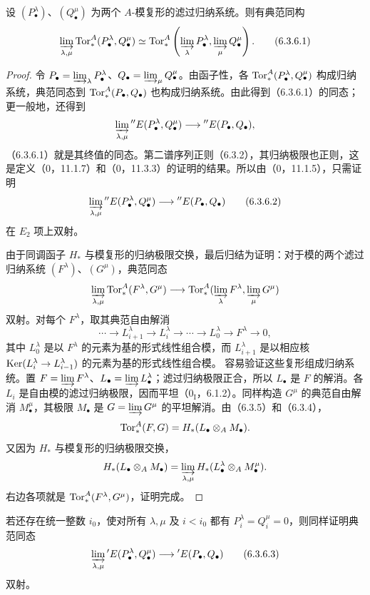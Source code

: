 设 $(P_\bullet^\lambda)$、$(Q_\bullet^\mu)$ 为两个 $A$-模复形的滤过归纳系统。则有典范同构
\begin{equation}
 \varinjlim_{\lambda,\mu}\operatorname{Tor}_*^A(P_\bullet^\lambda,Q_\bullet^\mu)
 \simeq\operatorname{Tor}_*^A\left(\varinjlim_\lambda P_\bullet^\lambda,
                         \varinjlim_\mu Q_\bullet^\mu\right).\tag{6.3.6.1}
\end{equation}
\begin{proof}
令 $P_\bullet=\varinjlim_\lambda P_\bullet^\lambda$、$Q_\bullet=\varinjlim_\mu Q_\bullet^\mu$。由函子性，各 $\operatorname{Tor}_*^A(P_\bullet^\lambda,Q_\bullet^\mu)$ 构成归纳系统，典范同态到 $\operatorname{Tor}_*^A(P_\bullet,Q_\bullet)$ 也构成归纳系统。由此得到（6.3.6.1）的同态；更一般地，还得到
\[
 \varinjlim_{\lambda,\mu}{}''E(P_\bullet^\lambda,Q_\bullet^\mu)
 \longrightarrow{}''E(P_\bullet,Q_\bullet),
\]
（6.3.6.1）就是其终值的同态。第二谱序列正则（6.3.2），其归纳极限也正则，这是定义（0，11.1.7）和（0，11.3.3）的证明的结果。所以由（0，11.1.5），只需证明
\begin{equation}
 \varinjlim_{\lambda,\mu}{}''E(P_\bullet^\lambda,Q_\bullet^\mu)
 \longrightarrow{}''E(P_\bullet,Q_\bullet)\tag{6.3.6.2}
\end{equation}
在 $E_2$ 项上双射。

由于同调函子 $H_*$ 与模复形的归纳极限交换，最后归结为证明：对于模的两个滤过归纳系统 $(F^\lambda)$、$(G^\mu)$，典范同态
\[
 \varinjlim_{\lambda,\mu}\operatorname{Tor}_*^A(F^\lambda,G^\mu)
 \longrightarrow\operatorname{Tor}_*^A(\varinjlim_\lambda F^\lambda,\varinjlim_\mu G^\mu)
\]
双射。对每个 $F^\lambda$，取其典范自由解消
\[
 \cdots\longrightarrow L_{i+1}^\lambda\longrightarrow L_i^\lambda
 \longrightarrow\cdots\longrightarrow L_0^\lambda\longrightarrow F^\lambda
 \longrightarrow0,
\]
其中 $L_0^\lambda$ 是以 $F^\lambda$ 的元素为基的形式线性组合模，而 $L_{i+1}^\lambda$ 是以相应核 $\operatorname{Ker}(L_i^\lambda\to L_{i-1}^\lambda)$ 的元素为基的形式线性组合模。
容易验证这些复形组成归纳系统。置 $F=\varinjlim F^\lambda$、$L_\bullet=\varinjlim L_\bullet^\lambda$；滤过归纳极限正合，所以 $L_\bullet$ 是 $F$ 的解消。各 $L_i$ 是自由模的滤过归纳极限，因而平坦（$0_{\mathrm I}$，6.1.2）。同样构造 $G^\mu$ 的典范自由解消 $M_\bullet^\mu$，其极限 $M_\bullet$ 是 $G=\varinjlim G^\mu$ 的平坦解消。由（6.3.5）和（6.3.4），
\[
 \operatorname{Tor}_*^A(F,G)=H_*(L_\bullet\otimes_AM_\bullet).
\]
又因为 $H_*$ 与模复形的归纳极限交换，
\[
 H_*(L_\bullet\otimes_AM_\bullet)
 =\varinjlim_{\lambda,\mu}H_*(L_\bullet^\lambda\otimes_AM_\bullet^\mu).
\]
右边各项就是 $\operatorname{Tor}_*^A(F^\lambda,G^\mu)$，证明完成。
\end{proof}
若还存在统一整数 $i_0$，使对所有 $\lambda,\mu$ 及 $i<i_0$ 都有 $P_i^\lambda=Q_i^\mu=0$，则同样证明典范同态
\begin{equation}
 \varinjlim_{\lambda,\mu}{}'E(P_\bullet^\lambda,Q_\bullet^\mu)
 \longrightarrow{}'E(P_\bullet,Q_\bullet)\tag{6.3.6.3}
\end{equation}
双射。

